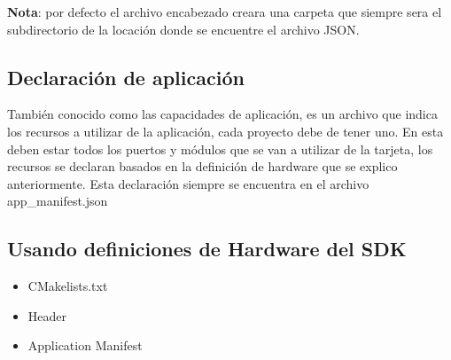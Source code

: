 \textbf{Nota}: por defecto el archivo encabezado creara una carpeta que siempre sera el subdirectorio de la locación donde se encuentre el archivo JSON.
\subsection{Declaración de aplicación}
También conocido como las capacidades de aplicación, es un archivo que indica los recursos a utilizar de la aplicación, cada proyecto debe de tener uno. En esta deben estar todos los puertos y módulos que se van a utilizar de la tarjeta, los recursos se declaran basados en la definición de hardware que se explico anteriormente. Esta declaración siempre se encuentra en el archivo app\_manifest.json


\subsection{Usando definiciones de Hardware del SDK}
\begin{itemize}
	\item 
	CMakelists.txt
	\item 
	Header
	\item 
	Application Manifest
	
\end{itemize}